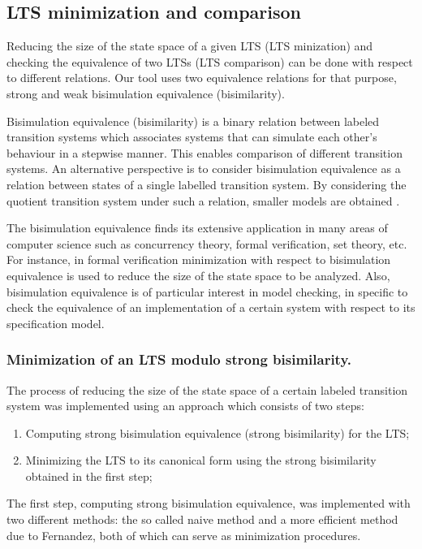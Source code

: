 \subsection{LTS minimization and comparison}

Reducing the size of the state space of a given LTS (LTS minization) and checking the equivalence of two LTSs (LTS comparison) can be done with respect to different relations. Our tool uses two equivalence relations for that purpose, strong and weak bisimulation equivalence (bisimilarity).

Bisimulation equivalence (bisimilarity) is a binary relation between labeled transition systems which associates systems that can simulate each other's behaviour in a stepwise manner. This enables comparison of different transition systems. An alternative perspective is to consider bisimulation equivalence as a relation between states of a single labelled transition system. By considering the quotient transition system under such a relation, smaller models are obtained \cite{ModelChecking}.

The bisimulation equivalence finds its extensive application in many areas of computer science such as concurrency theory, formal verification, set theory, etc. For instance, in formal verification minimization with respect to bisimulation equivalence is used to reduce the size of the state space to be analyzed. Also, bisimulation equivalence is of particular interest in model checking, in specific to check the equivalence of an implementation of a certain system with respect to its specification model.

\subsubsection{Minimization of an LTS modulo strong bisimilarity.}
The process of reducing the size of the state space of a certain labeled transition system was implemented using an approach which consists of two steps:
\begin{enumerate}
\item Computing strong bisimulation equivalence (strong bisimilarity) for the LTS;
\item Minimizing the LTS to its canonical form using the strong bisimilarity obtained in the first step;
\end{enumerate}

The first step, computing strong bisimulation equivalence, was implemented with two different methods: the so called
naive method and a more efficient method due to Fernandez, both of which can serve as minimization procedures.

